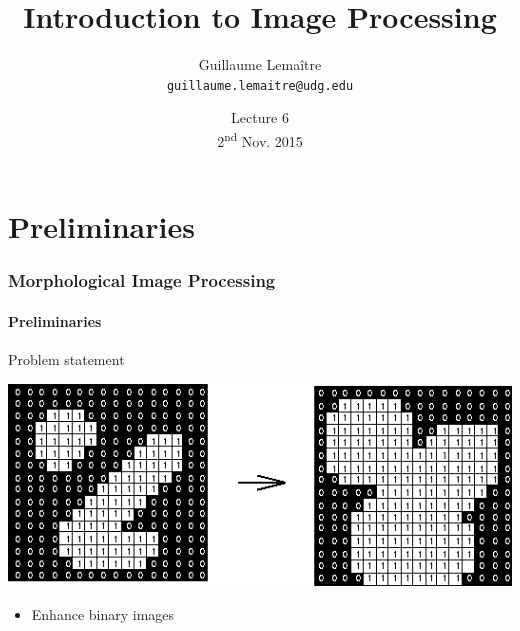 \documentclass{beamer}
\title{Introduction to Image Processing}
\author{Guillaume Lema\^itre \\ \texttt{guillaume.lemaitre@udg.edu}}
\date{Lecture 6 \\ 2\textsuperscript{nd} Nov. 2015}
\institute{Universit\'e de Bourgogne}
\begin{document}
\begin{frame}
  \titlepage
\end{frame}

\begin{frame}
  \tableofcontents[sectionstyle=show,subsectionstyle=show,subsubsectionstyle=hide]
\end{frame}


\section{Preliminaries}

\begin{frame}
\frametitle{Morphological Image Processing}
\framesubtitle{Preliminaries}
\begin{block}{Problem statement}\scriptsize
  \begin{center}
    \includegraphics[height=0.4\textheight]{images/dilation.png}
  \end{center}
    \begin{itemize}
    \item Enhance binary images
  \end{itemize}
\end{block}
\end{frame}
\end{document}
